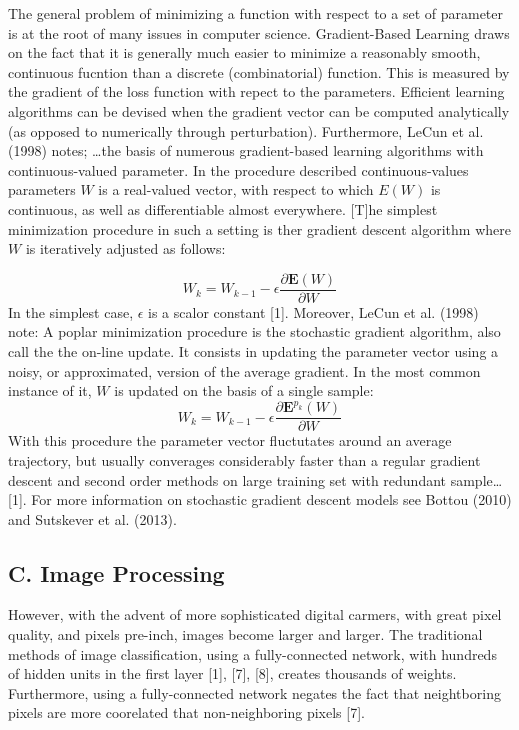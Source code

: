 \documentclass[conference,final,]{IEEEtran}
\begin{document}
The general problem of minimizing a function with respect to a set of
parameter is at the root of many issues in computer science.
Gradient-Based Learning draws on the fact that it is generally much
easier to minimize a reasonably smooth, continuous fucntion than a
discrete (combinatorial) function. This is measured by the gradient of
the loss function with repect to the parameters. Efficient learning
algorithms can be devised when the gradient vector can be computed
analytically (as opposed to numerically through perturbation).
Furthermore, LeCun et al. (1998) notes; \ldots{}the basis of numerous
gradient-based learning algorithms with continuous-valued parameter. In
the procedure described continuous-values parameters \(W\) is a
real-valued vector, with respect to which \(E(W)\) is continuous, as
well as differentiable almost everywhere. {[}T{]}he simplest
minimization procedure in such a setting is ther gradient descent
algorithm where \(W\) is iteratively adjusted as follows:

\[W_k = W_{k-1}-\epsilon\frac{\partial \mathbf{E}(W)}{\partial W}\] In
the simplest case, \(\epsilon\) is a scalor constant {[}1{]}. Moreover,
LeCun et al. (1998) note: A poplar minimization procedure is the
stochastic gradient algorithm, also call the the on-line update. It
consists in updating the parameter vector using a noisy, or
approximated, version of the average gradient. In the most common
instance of it, \(W\) is updated on the basis of a single sample:
\[W_k = W_{k-1}-\epsilon\frac{\partial \mathbf{E}^{p_k}(W)}{\partial W}\]
With this procedure the parameter vector fluctutates around an average
trajectory, but usually converages considerably faster than a regular
gradient descent and second order methods on large training set with
redundant sample\ldots{}{[}1{]}. For more information on stochastic
gradient descent models see Bottou (2010) and Sutskever et al. (2013).

\subsection{C. Image Processing}\label{c.-image-processing}

However, with the advent of more sophisticated digital carmers, with
great pixel quality, and pixels pre-inch, images become larger and
larger. The traditional methods of image classification, using a
fully-connected network, with hundreds of hidden units in the first
layer {[}1{]}, {[}7{]}, {[}8{]}, creates thousands of weights.
Furthermore, using a fully-connected network negates the fact that
neightboring pixels are more coorelated that non-neighboring pixels
{[}7{]}.
\end{document}
